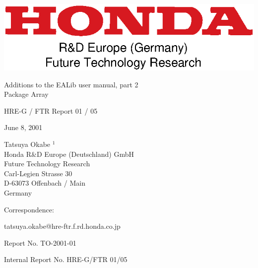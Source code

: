 \begin{center}
\includegraphics{honda-ftr.eps}

\vspace*{70pt}
{\LARGE
Additions to the EALib user manual, part 2}\\
{\LARGE
Package Array}\\

\vspace*{10mm}

HRE-G / FTR Report 01 / 05\\

\vspace*{30mm}

June 8, 2001\\

\vspace*{30mm}

Tatsuya Okabe $^1$\\

Honda R\&D Europe (Deutschland) GmbH\\
Future Technology Research\\
Carl-Legien Strasse 30\\
D-63073 Offenbach / Main\\
Germany\\

\vspace*{30mm}

\end{center}

\noindent
Correspondence:

\noindent
tatsuya.okabe@hre-ftr.f.rd.honda.co.jp

\clearpage

\noindent
Report No. TO-2001-01

\noindent
Internal Report No. HRE-G/FTR 01/05
